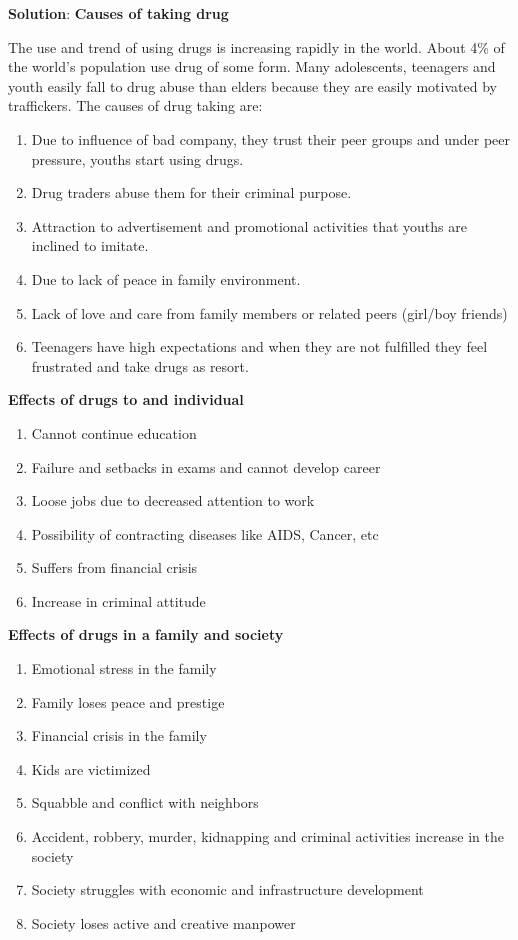 \documentclass[
]{book}
\newenvironment{solution}{ {\bfseries Solution}:}{}
\begin{document}
\begin{questions}
\begin{solution}
\textbf{Causes of taking drug}

The use and trend of using drugs is increasing rapidly in the world. About 4\% of the world's population use drug of some form. Many adolescents, teenagers and youth easily fall to drug abuse than elders because they are easily motivated by traffickers. The causes of drug taking are:
\begin{enumerate}
\item Due to influence of bad company, they trust their peer groups and under peer pressure, youths start using drugs.
\item Drug traders abuse them for their criminal purpose.
\item Attraction to advertisement and promotional activities that youths are inclined to imitate.
\item Due to lack of peace in family environment.
\item Lack of love and care from family members or related peers (girl/boy friends)
\item Teenagers have high expectations and when they are not fulfilled they feel frustrated and take drugs as resort.
\end{enumerate}

\textbf{Effects of drugs to and individual}
\begin{enumerate}
\item Cannot continue education
\item Failure and setbacks in exams and cannot develop career
\item Loose jobs due to decreased attention to work
\item Possibility of contracting diseases like AIDS, Cancer, etc
\item Suffers from financial crisis
\item Increase in criminal attitude
\end{enumerate}

\textbf{Effects of drugs in a family and society}
\begin{enumerate}
\item Emotional stress in the family
\item Family loses peace and prestige
\item Financial crisis in the family
\item Kids are victimized
\item Squabble and conflict with neighbors
\item Accident, robbery, murder, kidnapping and criminal activities increase in the society
\item Society struggles with economic and infrastructure development
\item Society loses active and creative manpower
\end{enumerate}


\end{solution}
\end{questions}
\end{document}
